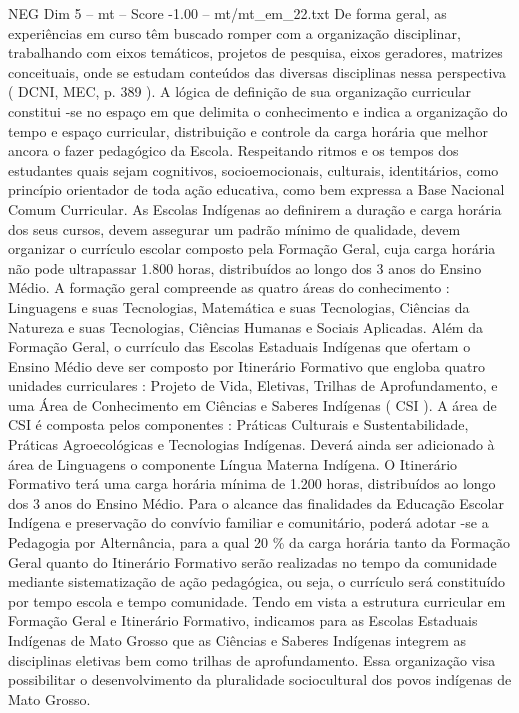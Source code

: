 \begin{textsample}{NEG Dim 5 – mt – Score -1.00 – mt/mt\_em\_22.txt}
De forma geral, as experiências em curso têm buscado romper com a organização disciplinar, trabalhando com eixos temáticos, projetos de pesquisa, eixos geradores, matrizes conceituais, onde se estudam conteúdos das diversas disciplinas nessa perspectiva ( DCNI, MEC, p. 389 ).
A lógica de definição de sua organização curricular constitui -se no espaço em que delimita o conhecimento e indica a organização do tempo e espaço curricular, distribuição e controle da carga horária que melhor ancora o fazer pedagógico da Escola.
Respeitando ritmos e os tempos dos estudantes quais sejam cognitivos, socioemocionais, culturais, identitários, como princípio orientador de toda ação educativa, como bem expressa a Base Nacional Comum Curricular.
As Escolas Indígenas ao definirem a duração e carga horária dos seus cursos, devem assegurar um padrão mínimo de qualidade, devem organizar o currículo escolar composto pela Formação Geral, cuja carga horária não pode ultrapassar 1.800 horas, distribuídos ao longo dos 3 anos do Ensino Médio.
A formação geral compreende as quatro áreas do conhecimento : Linguagens e suas Tecnologias, Matemática e suas Tecnologias, Ciências da Natureza e suas Tecnologias, Ciências Humanas e Sociais Aplicadas.
Além da Formação Geral, o currículo das Escolas Estaduais Indígenas que ofertam o Ensino Médio deve ser composto por Itinerário Formativo que engloba quatro unidades curriculares : Projeto de Vida, Eletivas, Trilhas de Aprofundamento, e uma Área de Conhecimento em Ciências e Saberes Indígenas ( CSI ).
A área de CSI é composta pelos componentes : Práticas Culturais e Sustentabilidade, Práticas Agroecológicas e Tecnologias Indígenas.
Deverá ainda ser adicionado à área de Linguagens o componente Língua Materna Indígena.
O Itinerário Formativo terá uma carga horária mínima de 1.200 horas, distribuídos ao longo dos 3 anos do Ensino Médio.
Para o alcance das finalidades da Educação Escolar Indígena e preservação do convívio familiar e comunitário, poderá adotar -se a Pedagogia por Alternância, para a qual 20 \% da carga horária tanto da Formação Geral quanto do Itinerário Formativo serão realizadas no tempo da comunidade mediante sistematização de ação pedagógica, ou seja, o currículo será constituído por tempo escola e tempo comunidade.
Tendo em vista a estrutura curricular em Formação Geral e Itinerário Formativo, indicamos para as Escolas Estaduais Indígenas de Mato Grosso que as Ciências e Saberes Indígenas integrem as disciplinas eletivas bem como trilhas de aprofundamento.
Essa organização visa possibilitar o desenvolvimento da pluralidade sociocultural dos povos indígenas de Mato Grosso.

\end{textsample}
